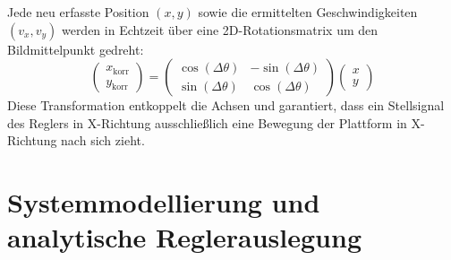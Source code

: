 \documentclass[11pt, a4paper]{scrreprt}
\begin{document}
Jede neu erfasste Position $(x, y)$ sowie die ermittelten Geschwindigkeiten $(v_x, v_y)$ werden in Echtzeit über eine 2D-Rotationsmatrix um den Bildmittelpunkt gedreht:
\begin{equation}
    \begin{pmatrix} x_{\text{korr}} \\ y_{\text{korr}} \end{pmatrix} =
    \begin{pmatrix} \cos(\Delta\theta) & -\sin(\Delta\theta) \\ \sin(\Delta\theta) & \cos(\Delta\theta) \end{pmatrix}
    \begin{pmatrix} x \\ y \end{pmatrix}
\end{equation}
Diese Transformation entkoppelt die Achsen und garantiert, dass ein Stellsignal des Reglers in X-Richtung ausschließlich eine Bewegung der Plattform in X-Richtung nach sich zieht.

\section{Systemmodellierung und analytische Reglerauslegung}
\label{sec:pid_entwurf}
\end{document}
